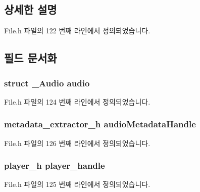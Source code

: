 \subsection{상세한 설명}


File.\-h 파일의 122 번째 라인에서 정의되었습니다.



\subsection{필드 문서화}
\hypertarget{struct___audio_extends_a5fd9dfc5896f2475249e5814bc957cd3}{
\subsubsection[{audio}]{\setlength{\rightskip}{0pt plus 5cm}struct {\bf \-\_\-\-Audio} audio}}\label{struct___audio_extends_a5fd9dfc5896f2475249e5814bc957cd3}


File.\-h 파일의 124 번째 라인에서 정의되었습니다.

\hypertarget{struct___audio_extends_afb8274c680a31f19a7967b768e11ba52}{
\subsubsection[{audio\-Metadata\-Handle}]{\setlength{\rightskip}{0pt plus 5cm}metadata\-\_\-extractor\-\_\-h audio\-Metadata\-Handle}}\label{struct___audio_extends_afb8274c680a31f19a7967b768e11ba52}


File.\-h 파일의 126 번째 라인에서 정의되었습니다.

\hypertarget{struct___audio_extends_acdbf0738be9fa70a60412d48cad881ee}{
\subsubsection[{player\-\_\-handle}]{\setlength{\rightskip}{0pt plus 5cm}player\-\_\-h player\-\_\-handle}}\label{struct___audio_extends_acdbf0738be9fa70a60412d48cad881ee}


File.\-h 파일의 125 번째 라인에서 정의되었습니다.

